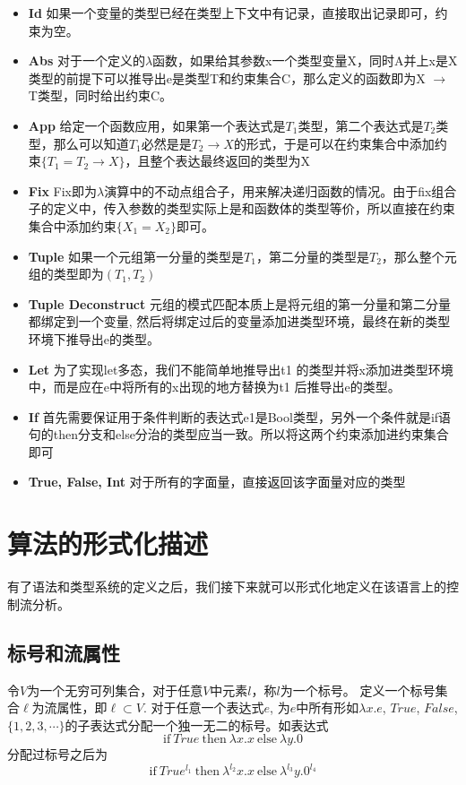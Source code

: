 \documentclass[UTF8, colorlinks]{pkuthss}
\begin{document}
	\begin{itemize}
		\item \textbf{Id} 如果一个变量的类型已经在类型上下文中有记录，直接取出记录即可，约束为空。
		\item \textbf{Abs} 对于一个定义的$\lambda$函数，如果给其参数x一个类型变量X，同时A并上x是X类型的前提下可以推导出e是类型T和约束集合C，那么定义的函数即为X $\to$ T类型，同时给出约束C。
		\item \textbf{App} 给定一个函数应用，如果第一个表达式是$T_1$类型，第二个表达式是$T_2$类型，那么可以知道$T_1$必然是是$T_2\to X$的形式，于是可以在约束集合中添加约束$\{T_1 = T_2\to X\}$，且整个表达最终返回的类型为X
		\item\textbf{Fix} Fix即为$\lambda$演算中的不动点组合子，用来解决递归函数的情况。由于fix组合子的定义中，传入参数的类型实际上是和函数体的类型等价，所以直接在约束集合中添加约束$\{X_1 = X_2\}$即可。
		\item\textbf{Tuple} 如果一个元组第一分量的类型是$T_1$，第二分量的类型是$T_2$，那么整个元组的类型即为$(T_1, T_2)$
		\item\textbf{Tuple Deconstruct} 元组的模式匹配本质上是将元组的第一分量和第二分量都绑定到一个变量, 然后将绑定过后的变量添加进类型环境，最终在新的类型环境下推导出e的类型。
		\item\textbf{Let} \cite{Milner}为了实现let多态，我们不能简单地推导出t1 的类型并将x添加进类型环境中，而是应在e中将所有的x出现的地方替换为t1 后推导出e的类型。
		\item\textbf{If} 首先需要保证用于条件判断的表达式e1是Bool类型，另外一个条件就是if语句的then分支和else分治的类型应当一致。所以将这两个约束添加进约束集合即可
		\item\textbf{True, False, Int} 对于所有的字面量，直接返回该字面量对应的类型
	\end{itemize}


\chapter{算法的形式化描述}
有了语法和类型系统的定义之后，我们接下来就可以形式化地定义在该语言上的控制流分析。
\section{标号和流属性}
	令$V$为一个无穷可列集合，对于任意$V$中元素$l$，称$l$为一个标号。 定义一个标号集合$\ell$为流属性，即$\ell\subset V$. 对于任意一个表达式$e$, 为$e$中所有形如$\lambda x.e$, $True$, $False$, $\{1, 2, 3,\cdots\}$的子表达式分配一个独一无二的标号。如表达式$$\mathrm{if}\ True\ \mathrm{then}\ \lambda x.x\ \mathrm{else}\ \lambda y.0$$分配过标号之后为$$\mathrm{if}\ True^{l_1}\ \mathrm{then}\ \lambda^{l_2} x.x\ \mathrm{else}\ \lambda^{l_3} y.0^{l_4}$$
\end{document}
